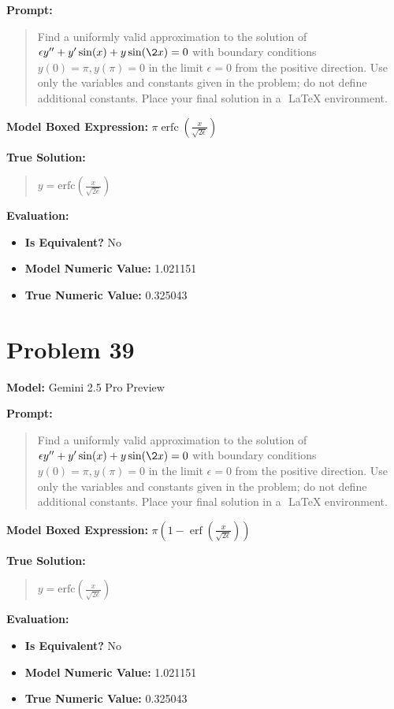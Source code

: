 \documentclass{article}
\begin{document}
\textbf{Prompt:}
\begin{quote}
Find a uniformly valid approximation to the solution of $ \epsilon y'' + y' \sin(x) + y \sin(\2x) = 0$ with boundary conditions $ y(0) = \pi, y(\pi) = 0 $ in the limit $\epsilon = 0$ from the positive direction. Use only the variables and constants given in the problem; do not define additional constants. Place your final solution in a $\boxed{}$ LaTeX environment.
\end{quote}
\textbf{Model Boxed Expression:} $\pi \operatorname{erfc}\left(\frac{x}{\sqrt{2\epsilon}}\right)$

\textbf{True Solution:}
\begin{quote}
$y = \text{erfc}(\frac{x}{\sqrt{2\epsilon}})$
\end{quote}

\textbf{Evaluation:}
\begin{itemize}
\item \textbf{Is Equivalent?} No
\item \textbf{Model Numeric Value:} 1.021151
\item \textbf{True Numeric Value:} 0.325043
\end{itemize}
\vspace{1cm}
\section*{Problem 39}
\textbf{Model:} Gemini 2.5 Pro Preview

\textbf{Prompt:}
\begin{quote}
Find a uniformly valid approximation to the solution of $ \epsilon y'' + y' \sin(x) + y \sin(\2x) = 0$ with boundary conditions $ y(0) = \pi, y(\pi) = 0 $ in the limit $\epsilon = 0$ from the positive direction. Use only the variables and constants given in the problem; do not define additional constants. Place your final solution in a $\boxed{}$ LaTeX environment.
\end{quote}
\textbf{Model Boxed Expression:} $\pi\left(1-\operatorname{erf}\left(\frac{x}{\sqrt{2\epsilon}}\right)\right)$

\textbf{True Solution:}
\begin{quote}
$y = \text{erfc}(\frac{x}{\sqrt{2\epsilon}})$
\end{quote}

\textbf{Evaluation:}
\begin{itemize}
\item \textbf{Is Equivalent?} No
\item \textbf{Model Numeric Value:} 1.021151
\item \textbf{True Numeric Value:} 0.325043
\end{itemize}
\vspace{1cm}
\end{document}
